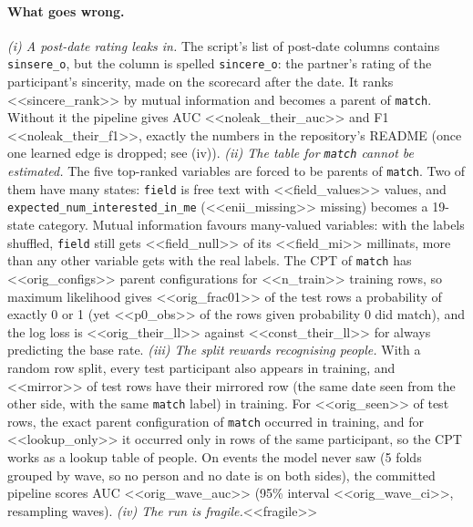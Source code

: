 \paragraph{What goes wrong.} \emph{(i) A post-date rating leaks in.} The script's list of
post-date columns contains \texttt{sinsere\_o}, but the column is spelled \texttt{sincere\_o}: the partner's
rating of the participant's sincerity, made on the scorecard after the date. It ranks
<<sincere_rank>> by mutual information and becomes a parent of \texttt{match}. Without it the
pipeline gives AUC <<noleak_their_auc>> and F1 <<noleak_their_f1>>, exactly the numbers in the
repository's README (once one learned edge is dropped; see (iv)). \emph{(ii) The table for \texttt{match} cannot be estimated.} The five
top-ranked variables are forced to be parents of \texttt{match}. Two of them have many states:
\texttt{field} is free text with <<field_values>> values, and
\texttt{expected\_num\_interested\_in\_me} (<<enii_missing>> missing) becomes a 19-state category.
Mutual information favours many-valued variables: with the labels shuffled, \texttt{field} still
gets <<field_null>> of its <<field_mi>> millinats, more than any other variable gets with the real
labels. The
CPT of \texttt{match} has <<orig_configs>> parent configurations for <<n_train>> training rows, so
maximum likelihood gives <<orig_frac01>> of the test rows a probability of exactly 0 or 1 (yet
<<p0_obs>> of the rows given probability 0 did match), and the log loss is <<orig_their_ll>> against
<<const_their_ll>> for always predicting the base rate.
\emph{(iii) The split rewards recognising people.} With a random row split, every test participant
also appears in training, and <<mirror>> of test rows have their mirrored row (the same date seen
from the other side, with the same \texttt{match} label) in training. For <<orig_seen>> of test
rows, the exact parent configuration of \texttt{match} occurred in training, and for <<lookup_only>>
it occurred only in rows of the same participant, so the CPT works as a lookup table of people. On events the model never saw (5 folds grouped by wave, so no person and no
date is on both sides), the committed pipeline scores AUC <<orig_wave_auc>>
(95\% interval <<orig_wave_ci>>, resampling waves). \emph{(iv) The run is fragile.}<<fragile>>


